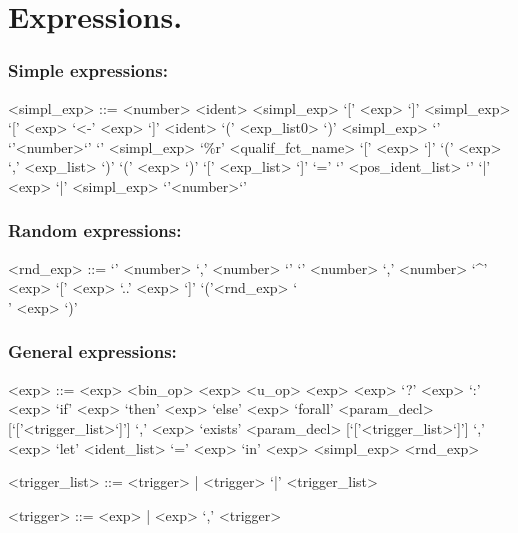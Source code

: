 \section{Expressions.}

\subsubsection*{Simple expressions:}
\begin{ecgrammar}
<simpl_exp> ::=  <number>
            \alt <ident>
            \alt <simpl_exp> `[' <exp> `]'  
            \alt <simpl_exp> `[' <exp> `<-' <exp> `]' 
            \alt <ident> `(' <exp_list0> `)'
            \alt <simpl_exp> `{' `{'<number>`}' `}' 
            \alt <simpl_exp> `\%r' 
            \alt <qualif_fct_name> `[' <exp> `]' 
            \alt `(' <exp> `,' <exp_list> `)' 
            \alt `(' <exp> `)'
            \alt `[' <exp_list> `]'
            \alt `=' `{' <pos_ident_list> `}'
            \alt `|' <exp> `|'
            \alt <simpl_exp> `{'<number>`}'
\end{ecgrammar}

\subsubsection*{Random expressions:}
\begin{ecgrammar}
<rnd_exp> ::=  `{' <number> `,' <number> `}' 
          \alt `{' <number> `,' <number> `}^' <exp>
          \alt `[' <exp> `..' <exp> `]'
          \alt `('<rnd_exp> `\\' <exp> `)' 
\end{ecgrammar}

\subsubsection*{General expressions:}
\begin{ecgrammar}
<exp> ::=  <exp> <bin_op>  <exp>
      \alt <u_op> <exp>   
      \alt <exp> `?' <exp> `:' <exp> 
      \alt `if' <exp> `then' <exp> `else' <exp>
      \alt `forall' <param_decl> [`['<trigger_list>`]'] `,' <exp>
      \alt `exists' <param_decl> [`['<trigger_list>`]'] `,' <exp> 
      \alt `let'  <ident_list> `=' <exp> `in' <exp>
      \alt <simpl_exp>
      \alt <rnd_exp>

<trigger_list> ::= <trigger> |  <trigger> `|' <trigger_list> 

<trigger> ::= <exp> | <exp> `,' <trigger>


\end{ecgrammar}




